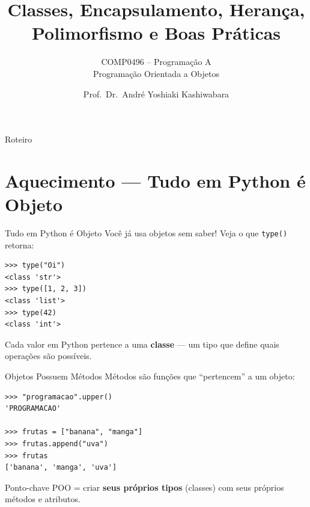 \documentclass[aspectratio=169]{beamer}
\subtitle{COMP0496 -- Programação A \\ Programação Orientada a Objetos}
\title{Classes, Encapsulamento, Herança, Polimorfismo e Boas Práticas}
\author{Prof.\ Dr.\ André Yoshiaki Kashiwabara}
\begin{document}
\begin{frame}[plain]
  \titlepage
\end{frame}

\begin{frame}[shrink=40]{Roteiro}
  \tableofcontents
\end{frame}


\section{Aquecimento --- Tudo em Python é Objeto}

\begin{frame}[fragile]{Tudo em Python é Objeto}
  Você já usa objetos sem saber! Veja o que \texttt{type()} retorna:

  \begin{lstlisting}
>>> type("Oi")
<class 'str'>
>>> type([1, 2, 3])
<class 'list'>
>>> type(42)
<class 'int'>
  \end{lstlisting}

  \vspace{0.3cm}
  Cada valor em Python pertence a uma \textbf{classe} --- um tipo que define
  quais operações são possíveis.
\end{frame}

\begin{frame}[fragile]{Objetos Possuem Métodos}
  Métodos são funções que ``pertencem'' a um objeto:

  \begin{lstlisting}
>>> "programacao".upper()
'PROGRAMACAO'

>>> frutas = ["banana", "manga"]
>>> frutas.append("uva")
>>> frutas
['banana', 'manga', 'uva']
  \end{lstlisting}

  \vspace{0.3cm}
  \begin{block}{Ponto-chave}
    POO = criar \textbf{seus próprios tipos} (classes)
    com seus próprios métodos e atributos.
  \end{block}
\end{frame}
\end{document}

